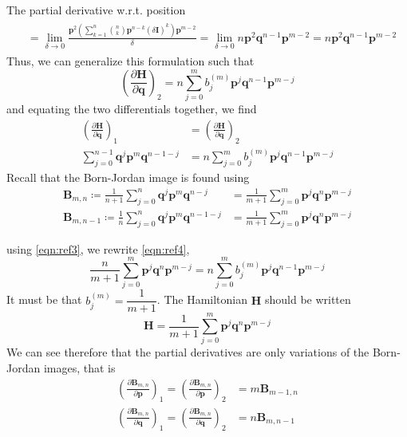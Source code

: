 \documentclass[aspectratio=169]{beamer}
\begin{document}
\begin{frame}[allowframebreaks]{The partial derivative w.r.t. position}
\begin{gather}
\begin{aligned}
			&=\lim_{\delta\to0}\frac{\textbf{p}^2\left(\displaystyle \sum_{k=1}^{n}\binom{n}{k}\textbf{p}^{n-k}(\delta\textbf{I})^k\right)\textbf{p}^{m-2}}{\delta}=\lim_{\delta\to0}n\textbf{p}^2\textbf{q}^{n-1}\textbf{p}^{m-2}=n\textbf{p}^2\textbf{q}^{n-1}\textbf{p}^{m-2}
			\end{aligned}
		\end{gather}
		Thus, we can generalize this formulation such that
		\begin{equation}
			\left( \frac{\partial\textbf{H}}{\partial\textbf{q}}\right)_2=n\sum_{j=0}^{m}b_j^{(m)}\textbf{p}^j\textbf{q}^{n-1}\textbf{p}^{m-j}
		\end{equation}
		and equating the two differentials together, we find
		\begin{align}
			\left( \frac{\partial\textbf{H}}{\partial\textbf{q}}\right)_1&=\left( \frac{\partial\textbf{H}}{\partial\textbf{q}}\right)_2\\
			\sum_{j=0}^{n-1}\textbf{q}^j\textbf{p}^m\textbf{q}^{n-1-j}&=n\sum_{j=0}^{m}b_j^{(m)}\textbf{p}^j\textbf{q}^{n-1}\textbf{p}^{m-j}\label{eqn:ref4}
		\end{align}
		Recall that the Born-Jordan image is found using
		\begin{align}
			\textbf{B}_{m,n}\coloneqq\frac{1}{n+1}\sum_{j=0}^n\textbf{q}^j\textbf{p}^m\textbf{q}^{n-j}&=\frac{1}{m+1}\sum_{j=0}^{m}\textbf{p}^j\textbf{q}^n\textbf{p}^{m-j} \\
			\textbf{B}_{m,n-1}\coloneqq\frac{1}{n}\sum_{j=0}^n\textbf{q}^j\textbf{p}^m\textbf{q}^{n-1-j}&=\frac{1}{m+1}\sum_{j=0}^{m}\textbf{p}^j\textbf{q}^n\textbf{p}^{m-j} \label{eqn:ref3}
		\end{align}
		
		\framebreak
		using \ref{eqn:ref3}, we rewrite \ref{eqn:ref4},
		\begin{equation}
			\frac{n}{m+1}\sum_{j=0}^{m}\textbf{p}^j\textbf{q}^n\textbf{p}^{m-j} =n\sum_{j=0}^{m}b_j^{(m)}\textbf{p}^j\textbf{q}^{n-1}\textbf{p}^{m-j}
		\end{equation}
		It must be that $b_j^{(m)}=\dfrac{1}{m+1}$. The Hamiltonian $\textbf{H}$ should be written
		\begin{equation}
			\textbf{H}=\frac{1}{m+1}\sum_{j=0}^m\textbf{p}^j\textbf{q}^n\textbf{p}^{m-j}
		\end{equation}
		We can see therefore that the partial derivatives are only variations of the Born-Jordan images, that is
		\begin{eqnarray}
			\left(\frac{\partial\textbf{B}_{m,n}}{\partial\textbf{p}}\right)_1=\left(\frac{\partial\textbf{B}_{m,n}}{\partial\textbf{p}}\right)_2&=m\textbf{B}_{m-1,n} \\
			\left(\frac{\partial\textbf{B}_{m,n}}{\partial\textbf{q}}\right)_1=\left(\frac{\partial\textbf{B}_{m,n}}{\partial\textbf{q}}\right)_2&=n\textbf{B}_{m,n-1}
		\end{eqnarray}
	\end{frame}
	
\end{document}
